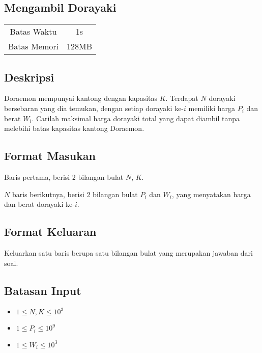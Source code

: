 \documentclass{article}
\begin{document}
\begin{center}
    \section*{Mengambil Dorayaki} %

    \begin{tabular}{ | c c | }
        \hline
        Batas Waktu  & 1s \\    %
        Batas Memori & 128MB \\  %
        \hline
    \end{tabular}
\end{center}

\subsection*{Deskripsi}

Doraemon mempunyai kantong dengan kapasitas $K$. Terdapat $N$ dorayaki bersebaran yang dia temukan, dengan setiap dorayaki ke-$i$ memiliki harga $P_i$ dan berat $W_i$. Carilah maksimal harga dorayaki total yang dapat diambil tanpa melebihi batas kapasitas kantong Doraemon.

\subsection*{Format Masukan}
Baris pertama, berisi 2 bilangan bulat $N$, $K$.

$N$ baris berikutnya, berisi 2 bilangan bulat $P_i$ dan $W_i$, yang menyatakan harga dan berat dorayaki ke-$i$.

\subsection*{Format Keluaran}
Keluarkan satu baris berupa satu bilangan bulat yang merupakan jawaban dari soal.

\subsection*{Batasan Input}

\begin{itemize}
    \item{$1 \leq N, K \leq 10^3$}
    \item{$1 \leq P_i \leq 10^9$}
    \item{$1 \leq W_i \leq 10^3$}
\end{itemize}
\end{document}
